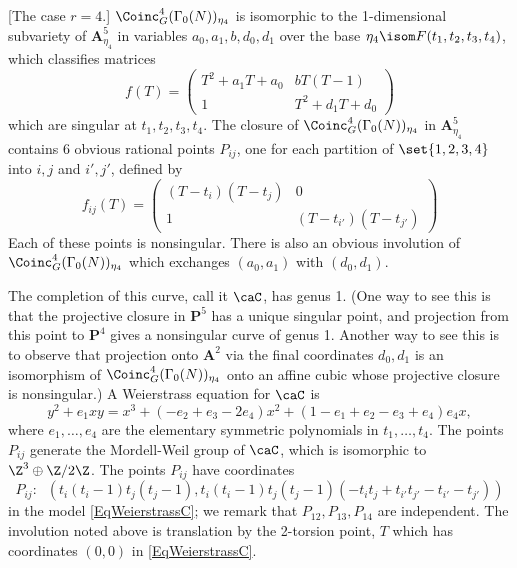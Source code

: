 \documentclass{article}
\newcommand{\adam}[1]{\textcolor{blue}{#1}}
\def\A{\mathbf{A}}
\def\P{\mathbf{P}}
\begin{document}
\begin{ex}\label{ex:coinc-4}[The case $r=4$.] $\Coinc^4_G(\Gamma_0(N))_{\eta_4}$ is isomorphic to the 1-dimensional subvariety of $\mathbf{A}^5_{\eta_4}$ in variables $a_0,a_1,b,d_0,d_1$ over the base $\eta_4\isom F(t_1,t_2,t_3,t_4)$, which classifies matrices
\[ f(T) = \begin{pmatrix} 
T^2 + a_1T+a_0 & bT(T-1) \\
1 & T^2+d_1T+d_0 
\end{pmatrix}
\]
which are singular at $t_1,t_2,t_3,t_4$.   The closure of $\Coinc^4_G(\Gamma_0(N))_{\eta_4}$ in $\mathbf{A}^5_{\eta_4}$ contains 6 obvious rational points $P_{ij}$, one for each partition of $\set{1,2,3,4}$ into ${i,j}$ and ${i',j'}$, defined by 
\[ f_{ij}(T)=\begin{pmatrix} (T-t_i)(T-t_j) & 0 \\ 1 & (T-t_{i'})(T-t_{j'}) \end{pmatrix} \]
Each of these points is nonsingular.   There is also an obvious involution of $\Coinc^4_G(\Gamma_0(N))_{\eta_4}$ which exchanges $(a_0,a_1)$ with $(d_0,d_1)$. 

The completion of this curve, call it $\caC$, has genus 1.  (One way to see this is that the projective closure in $\mathbf{P}^5$ has a unique singular point, and projection from this point to $\P^4$ gives a nonsingular curve of genus 1.  Another way to see this is to observe that projection onto $\A^2$ via the final coordinates $d_0,d_1$ is an isomorphism of $\Coinc^4_G(\Gamma_0(N))_{\eta_4}$ onto an affine cubic whose projective closure is nonsingular.)  A Weierstrass equation for $\caC$ is
\begin{equation}
\label{EqWeierstrassC}
 y^2 +e_1xy = x^3 + (-e_2+e_3-2e_4)x^2 + (1-e_1+e_2-e_3+e_4)e_4x,
 \end{equation}
where $e_1,\dots,e_4$ are the elementary symmetric polynomials in
$t_1,\dots,t_4$.   The points $P_{ij}$ generate the Mordell-Weil group of $\caC$, which is isomorphic to $\Z^3\oplus \Z/2\Z$.  The points $P_{ij}$ have coordinates 
\[ P_{ij}:\;\;(t_i(t_i-1)t_j(t_j-1),t_i(t_i-1)t_j(t_j-1)(-t_it_j+t_{i'}t_{j'}-t_{i'}-t_{j'}))\]
in the model \eqref{EqWeierstrassC};  we remark that $P_{12},P_{13},P_{14}$ are independent.  The involution noted above is translation by the 2-torsion point, $T$ which has coordinates $(0,0)$  in \eqref{EqWeierstrassC}.  






\end{ex}
\end{document}
